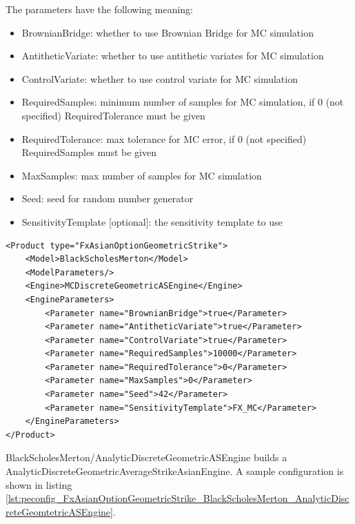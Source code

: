 The parameters have the following meaning:

\begin{itemize}
\item BrownianBridge: whether to use Brownian Bridge for MC simulation
\item AntitheticVariate: whether to use antithetic variates for MC simulation
\item ControlVariate: whether to use control variate for MC simulation
\item RequiredSamples: minimum number of samples for MC simulation, if 0 (not specified) RequiredTolerance must be given
\item RequiredTolerance: max tolerance for MC error, if 0 (not specified) RequiredSamples must be given
\item MaxSamples: max number of samples for MC simulation
\item Seed: seed for random number generator
\item SensitivityTemplate [optional]: the sensitivity template to use
\end{itemize}

\begin{longlisting}
\begin{verbatim}
<Product type="FxAsianOptionGeometricStrike">
    <Model>BlackScholesMerton</Model>
    <ModelParameters/>
    <Engine>MCDiscreteGeometricASEngine</Engine>
    <EngineParameters>
        <Parameter name="BrownianBridge">true</Parameter>
        <Parameter name="AntitheticVariate">true</Parameter>
        <Parameter name="ControlVariate">true</Parameter>
        <Parameter name="RequiredSamples">10000</Parameter>
        <Parameter name="RequiredTolerance">0</Parameter>
        <Parameter name="MaxSamples">0</Parameter>
        <Parameter name="Seed">42</Parameter>
        <Parameter name="SensitivityTemplate">FX_MC</Parameter>
    </EngineParameters>
</Product>
\end{verbatim}
\caption{Configuration for Product FxAsianOptionGeometricStrike, Model BlackScholesMerton, Engine MCDiscreteGeometricASEngine}
\label{lst:peconfig_FxAsianOptionGeometricStrike_BlackScholesMerton_MCDiscreteGeomtetricASEngine}
\end{longlisting}

BlackScholesMerton/AnalyticDiscreteGeometricASEngine builds a AnalyticDiscreteGeometricAverageStrikeAsianEngine. A sample
configuration is shown in listing
\ref{lst:peconfig_FxAsianOptionGeometricStrike_BlackScholesMerton_AnalyticDiscreteGeomtetricASEngine}.

